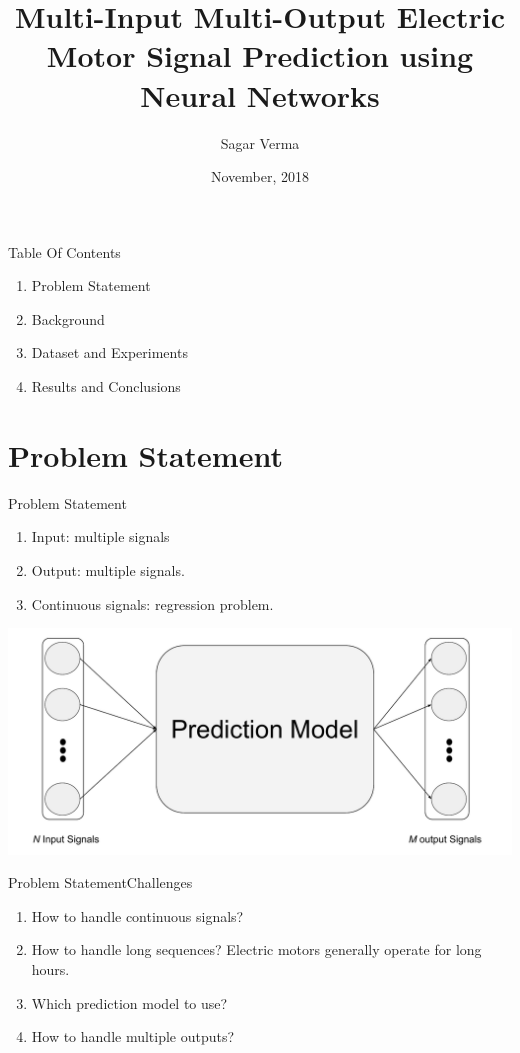 \documentclass[handout]{beamer}
\title[ \insertdate]{Multi-Input Multi-Output Electric Motor Signal Prediction using Neural Networks}
\author{Sagar Verma}
\institute[Centralesup\'elec and Schneider Electric] %
{
  Centre de Vision Num\'erique,\\
  Centralesup\'elec, Gif-sur-Yvette}
\date{November, 2018}
\begin{document}
\begin{frame}
\titlepage
\end{frame}

\begin{frame}{Table Of Contents}
\begin{enumerate}
\item Problem Statement
\item Background
\item Dataset and Experiments
\item Results and Conclusions
\end{enumerate}
\end{frame}

\section{Problem Statement}

\begin{frame}{Problem Statement}
\begin{center}
\begin{enumerate}
  \item Input: multiple signals
  \item Output: multiple signals.
  \item Continuous signals: regression problem.
\end{enumerate}
\vspace{.5cm}
\includegraphics[width=1\linewidth]{images/teaser}
\end{center}
\end{frame}


\begin{frame}{Problem Statement}{Challenges}
  \begin{enumerate}
    \item How to handle continuous signals?
    \item How to handle long sequences? Electric motors generally operate for long hours.
    \item Which prediction model to use?
    \item How to handle multiple outputs?
  \end{enumerate}
\end{frame}
\end{document}
